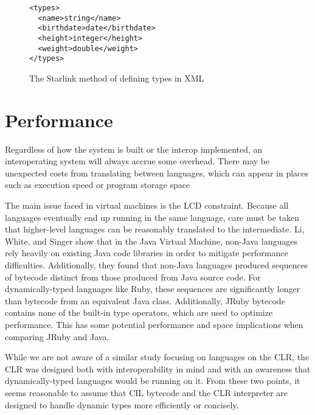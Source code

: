 \documentclass{sig-alternate}
\begin{document}

\begin{figure}
\begin{verbatim}
<types>
  <name>string</name>
  <birthdate>date</birthdate>
  <height>integer</height>
  <weight>double</weight>
</types>
\end{verbatim}
\caption{The Starlink method of defining types in XML}
\label{XMLMeta}
\end{figure}

\section{Performance} \label{performance}
Regardless of how the system is built or the interop implemented, an interoperating system will always accrue some overhead. There may be unexpected costs from translating between languages, which can appear in places such as execution speed or program storage space

The main issue faced in virtual machines is the LCD constraint. Because all languages eventually end up running in the same language, care must be taken that higher-level languages can be reasonably translated to the intermediate.
Li, White, and Singer \cite{Li:2013} show that in the Java Virtual Machine, non-Java languages rely heavily on existing Java code libraries in order to mitigate performance difficulties. Additionally, they found that non-Java languages produced sequences of bytecode distinct from those produced from Java source code.
For dynamically-typed languages like Ruby, these sequences are significantly longer than bytecode from an equivalent Java class. Additionally, JRuby bytecode contains none of the built-in type operators, which are used to optimize performance. This has some potential performance and space implications when comparing JRuby and Java.


While we are not aware of a similar study focusing on languages on the CLR, the CLR was designed both with interoperability in mind and with an awareness that dynamically-typed languages would be running on it. From these two points, it seems reasonable to assume that CIL bytecode and the CLR interpreter are designed to handle dynamic types more efficiently or concisely.
\end{document}
